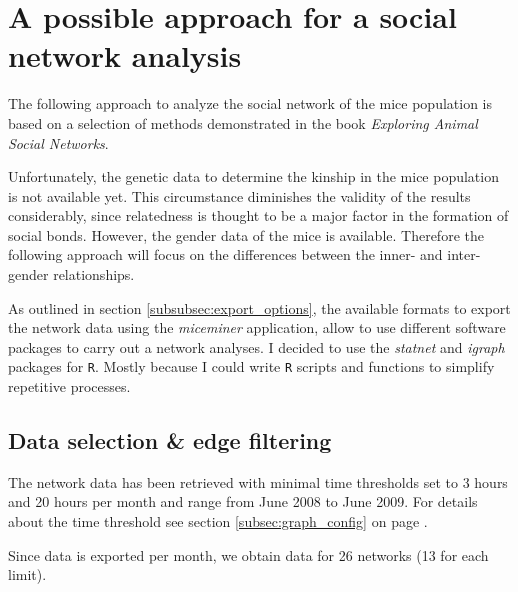 \section{A possible approach for a social network analysis}
\label{sec:network_analysis}

The following approach to analyze the social network of the mice population is based on a selection of methods demonstrated in the book \textit{Exploring Animal Social Networks}\citep{croft:07}. 

Unfortunately, the genetic data to determine the kinship in the mice population is not available yet. This circumstance diminishes the validity of the results considerably, since relatedness is thought to be a major factor in the formation of social bonds. However, the gender data of the mice is available. Therefore the following approach will focus on the differences between the inner- and inter-gender relationships.

As outlined in section \ref{subsubsec:export_options}, the available formats to export the network data using the \textit{miceminer} application, allow to use different software packages to carry out a network analyses. I decided to use the \textit{statnet}\citep{statnet:03} and \textit{igraph}\citep{igraph:06} packages for \lstinline|R|\citep{r:05}. Mostly because I could write \lstinline|R| scripts and functions to simplify repetitive processes.


\subsection{Data selection \& edge filtering}
\label{subsec:data_selection}


The network data has been retrieved with minimal time thresholds set to 3 hours and 20 hours per month and range from June 2008 to June 2009. For details about the time threshold see section \ref{subsec:graph_config} on page \pageref{subsec:graph_config}.

Since data is exported per month, we obtain data for 26 networks (13 for each limit).

